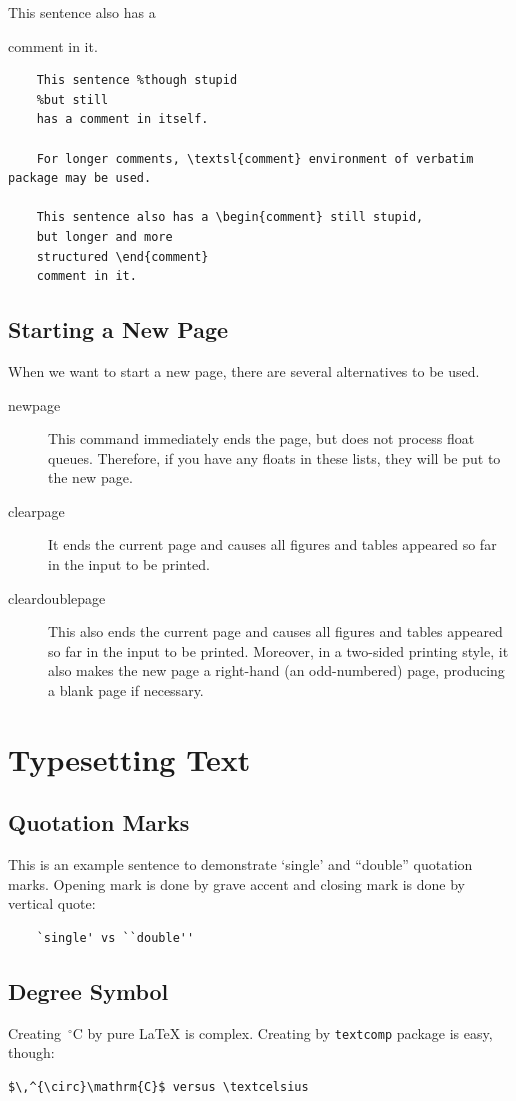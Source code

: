 \documentclass[10pt, a4paper]{article}
\begin{document}
This sentence also has a 
comment in it.
\begin{verbatim}
	This sentence %though stupid
	%but still
	has a comment in itself.
	
	For longer comments, \textsl{comment} environment of verbatim package may be used.
	
	This sentence also has a \begin{comment} still stupid,
	but longer and more
	structured \end{comment}
	comment in it.
\end{verbatim}
\subsection{Starting a New Page}
When we want to start a new page, there are several alternatives to be used.
\begin{description}
	\item[newpage] This command immediately ends the page, but does not process float queues. Therefore, if you have any floats in these lists, they will be put to the new page.
	\item[clearpage] It ends the current page and causes all figures and tables appeared so far in the input to be printed.
	\item[cleardoublepage] This also  ends the current page and causes all figures and tables appeared so far in the input to be printed. Moreover, in a two-sided printing style, it also makes the new page a right-hand (an odd-numbered) page, producing a blank page if necessary.
\end{description}
\clearpage
\section{Typesetting Text}
\subsection{Quotation Marks}
This is an example sentence to demonstrate `single' and ``double'' quotation marks. Opening mark is done by grave accent and closing mark is done by vertical quote:
\begin{verbatim}
	`single' vs ``double''
\end{verbatim}
\subsection{Degree Symbol}
Creating $\,^{\circ}\mathrm{C}$ by pure \LaTeX{} is complex. Creating \textcelsius{} by \texttt{textcomp} package is easy, though:
\begin{verbatim}
$\,^{\circ}\mathrm{C}$ versus \textcelsius
\end{verbatim}
\end{document}
